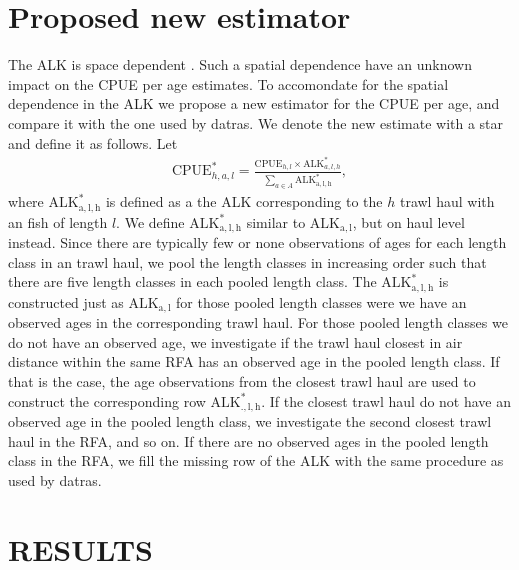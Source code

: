 \documentclass[a4paper 12pt]{article}
\numberwithin{equation}{section}
\begin{document}
\section{Proposed new estimator}
The ALK is space dependent \citep{berg2012spatial}. Such a spatial dependence have an unknown impact on the CPUE per age estimates. To accomondate for the spatial dependence in the ALK we propose a new estimator for the CPUE per age, and compare it with the one used by datras. We denote the new estimate with a star and define it as follows. Let
\begin{align}\label{cpueageNew}
\mathrm{CPUE}^*_{h,a,l} =  \displaystyle \frac{\mathrm{CPUE}_{h,l} \times \mathrm{ALK}_{a,l,h}^*}{\displaystyle \sum\limits_{a \in A} \mathrm{ALK_{a,l,h}^*}},
\end{align}
where $\mathrm{ALK_{a,l,h}^*}$ is defined as a the ALK corresponding to the $h$ trawl haul with an fish of length $l$. We define $\mathrm{ALK_{a,l,h}^*}$ similar to $\mathrm{ALK_{a,l}}$, but on haul level instead.  Since there are typically few or none observations of ages for each length class in an trawl haul, we pool the length classes in increasing order such that there are five length classes in each pooled length class. The $\mathrm{ALK_{a,l,h}^*}$ is constructed just as $\mathrm{ALK_{a,l}}$ for those pooled length classes were we have an observed ages in the corresponding trawl haul. For those pooled length classes we do not have an observed age, we investigate if the trawl haul closest in air distance within the same RFA has an observed age in the pooled length class. If that is the case, the age observations from the closest trawl haul are used to construct the corresponding row $\mathrm{ALK_{.,l,h}^*}$. If the closest trawl haul do not have an observed age in the pooled length class, we investigate the second closest trawl haul in the RFA, and so on. If there are no observed ages in the pooled length class in the RFA, we fill the missing row of the ALK with the same procedure as used by datras.
\clearpage
\section{RESULTS}
\end{document}
